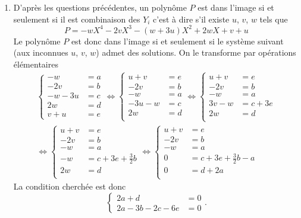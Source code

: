 \begin{enumerate}
\begin{enumerate}
\item D'après les questions précédentes, un polynôme $P$ est dans l'image si et seulement si il est combinaison des $Y_i$ c'est à dire s'il existe $u$, $v$, $w$ tels que 
\begin{displaymath}
 P = -w{X}^{4}-2v{X}^{3}-(w+3u){X}^{2}+2wX+v+u
\end{displaymath}
Le polynôme $P$ est donc dans l'image si et seulement si le système suivant (aux inconnues $u$, $v$, $w$) admet des solutions. On le transforme par opérations élémentaires
\begin{multline*}
 \left\lbrace 
\begin{aligned}
 -w &= a\\
-2v &= b \\
-w-3u &= c \\
2w &= d \\
v+u &= e
\end{aligned}
\right.
\Leftrightarrow 
 \left\lbrace 
\begin{aligned}
u + v &= e \\
-2v &= b \\
-w &= a\\
-3u -w &= c\\
2w &= d \\
\end{aligned}
\right.
\Leftrightarrow 
 \left\lbrace 
\begin{aligned}
u + v &= e \\
-2v &= b \\
-w &= a\\
3v -w&= c + 3e \\
2w &= d \\
\end{aligned}
\right. \\
\Leftrightarrow 
 \left\lbrace 
\begin{aligned}
u + v &= e \\
-2v &= b \\
-w &= a\\
-w&= c + 3e + \frac{3}{2}b \\
2w &= d \\
\end{aligned}
\right.
\Leftrightarrow 
 \left\lbrace 
\begin{aligned}
u + v &= e \\
-2v &= b \\
-w &= a\\
0 &= c + 3e + \frac{3}{2}b -a \\
0 &= d + 2a\\
\end{aligned}
\right.
\end{multline*}
La condition cherchée est donc
\[
 \left\lbrace
\begin{aligned}
  2a +d &= 0 \\
  2a - 3b -2c -6e &= 0 
\end{aligned}
\right. .
\]
\end{enumerate}
\end{enumerate}
